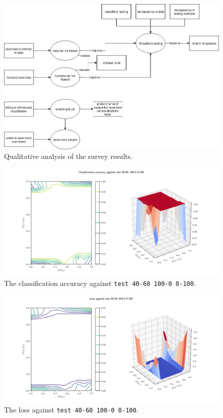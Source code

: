 \documentclass[]{report}
\newcommand{\code}{\texttt}
\begin{document}
\begin{figure}[h]
    \centering
    \includegraphics[scale=0.46]{figures/moral_ai_survey_analysis.jpg}
    \caption[]{Qualitative analysis of the survey results.}
    \label{fig:survey_analysis}
\end{figure}

% 
% 

\begin{figure}[h]
    \centering
    \centerline{\includegraphics[scale=0.55]{test_40-60_100-0_0-100_accuracy.png}}
    \caption[]{The classification accuracy against \code{test 40-60 100-0 0-100}.}
    \label{fig:test_40-60_100-0_0-100_accuracy_plot}
\end{figure}

\begin{figure}[h]
    \centering
    \centerline{\includegraphics[scale=0.55]{test_40-60_100-0_0-100_loss.png}}
    \caption[]{The loss against \code{test 40-60 100-0 0-100}.}
    \label{fig:test_40-60_100-0_0-100_loss_plot}
\end{figure}
\end{document}
